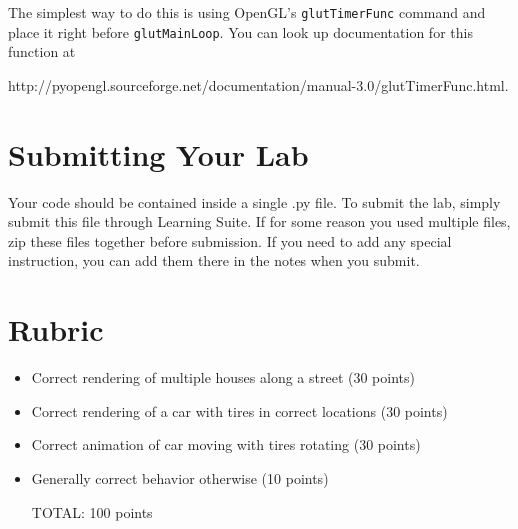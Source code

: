 \documentclass[11pt]{article}
\newif\ifinstructor
\begin{document}
The simplest way to do this is using OpenGL's {\tt glutTimerFunc} command and place it right before {\tt glutMainLoop}. You can look up documentation for this function at

http://pyopengl.sourceforge.net/documentation/manual-3.0/glutTimerFunc.html.

\divider

\section*{Submitting Your Lab}

Your code should be contained inside a single .py file. To submit the lab, simply submit this file through Learning Suite. If for some reason you used multiple files, zip these files together before submission. If you need to add any special instruction, you can add them there in the notes when you submit.

\divider

\section*{Rubric}

\begin{itemize}
    \item   Correct rendering of multiple houses along a street (30 points)
    \item   Correct rendering of a car with tires in correct locations (30 points)
    \item   Correct animation of car moving with tires rotating (30 points)
    \item   Generally correct behavior otherwise (10 points)	

TOTAL: 100 points

\end{itemize}



\ifinstructor

\divider

\section*{Concepts}

Besides laying the foundation for the upcoming labs, this assignment should reinforce the following concepts:
\begin{itemize}
	\item	Transformation Hierarchies
\end{itemize}

\fi
\end{document}

